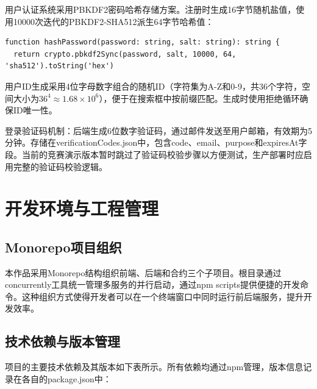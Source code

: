 \documentclass[UTF8,a4paper,zihao=-4,openany]{ctexrep}
\begin{document}
用户认证系统采用PBKDF2密码哈希存储方案。注册时生成16字节随机盐值，使用10000次迭代的PBKDF2-SHA512派生64字节哈希值：

\begin{lstlisting}[caption={PBKDF2密码哈希 (userService.ts:66-68)}]
function hashPassword(password: string, salt: string): string {
  return crypto.pbkdf2Sync(password, salt, 10000, 64, 'sha512').toString('hex')
\end{lstlisting}

用户ID生成采用4位字母数字组合的随机ID（字符集为A-Z和0-9，共36个字符，空间大小为$36^4 \approx 1.68 \times 10^6$），便于在搜索框中按前缀匹配。生成时使用拒绝循环确保ID唯一性。

登录验证码机制：后端生成6位数字验证码，通过邮件发送至用户邮箱，有效期为5分钟。存储在verificationCodes.json中，包含code、email、purpose和expiresAt字段。当前的竞赛演示版本暂时跳过了验证码校验步骤以方便测试，生产部署时应启用完整的验证码校验逻辑。


\section{开发环境与工程管理}

\subsection{Monorepo项目组织}

本作品采用Monorepo结构组织前端、后端和合约三个子项目。根目录通过concurrently工具统一管理多服务的并行启动，通过npm scripts提供便捷的开发命令。这种组织方式使得开发者可以在一个终端窗口中同时运行前后端服务，提升开发效率。

\subsection{技术依赖与版本管理}

项目的主要技术依赖及其版本如下表所示。所有依赖均通过npm管理，版本信息记录在各自的package.json中：
\end{document}
